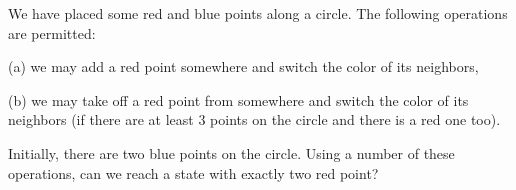 We have placed some red and blue points along a circle. The following operations are permitted:

(a) we may add a red point somewhere and switch the color of its neighbors,

(b) we may take off a red point from somewhere and switch the color of its neighbors (if there are at least $3$ points on the circle and there is a red one too).

Initially, there are two blue points on the circle. Using a number of these operations, can we reach a state with exactly two red point?
